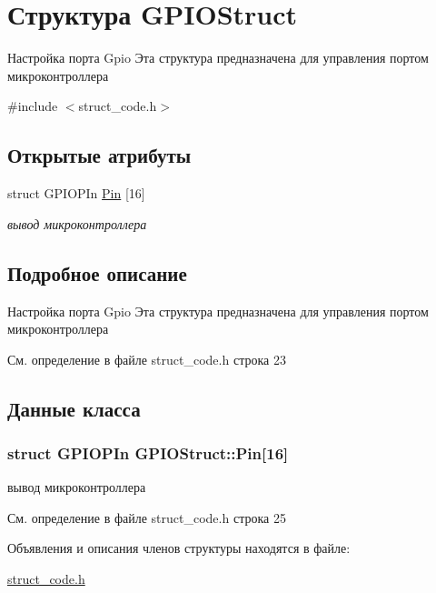 \hypertarget{struct_g_p_i_o_struct}{}\section{Структура G\+P\+I\+O\+Struct}
\label{struct_g_p_i_o_struct}


Настройка порта Gpio Эта структура предназначена для управления портом микроконтроллера  




{\ttfamily \#include $<$struct\+\_\+code.\+h$>$}

\subsection*{Открытые атрибуты}
\begin{DoxyCompactItemize}
\item 
struct G\+P\+I\+O\+P\+In \hyperlink{struct_g_p_i_o_struct_a86de6755c894e9527145c87cfa387f2c}{Pin} \mbox{[}16\mbox{]}
\begin{DoxyCompactList}\small\item\em вывод микроконтроллера \end{DoxyCompactList}\end{DoxyCompactItemize}


\subsection{Подробное описание}
Настройка порта Gpio Эта структура предназначена для управления портом микроконтроллера 

См. определение в файле struct\+\_\+code.\+h строка 23



\subsection{Данные класса}
\hypertarget{struct_g_p_i_o_struct_a86de6755c894e9527145c87cfa387f2c}{}
\subsubsection[{Pin}]{\setlength{\rightskip}{0pt plus 5cm}struct G\+P\+I\+O\+P\+In G\+P\+I\+O\+Struct\+::\+Pin\mbox{[}16\mbox{]}}\label{struct_g_p_i_o_struct_a86de6755c894e9527145c87cfa387f2c}


вывод микроконтроллера 



См. определение в файле struct\+\_\+code.\+h строка 25



Объявления и описания членов структуры находятся в файле\+:\begin{DoxyCompactItemize}
\item 
\hyperlink{struct__code_8h}{struct\+\_\+code.\+h}\end{DoxyCompactItemize}
